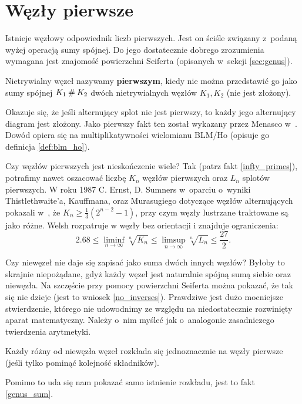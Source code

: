 \section{Węzły pierwsze}
\label{sec:prime_knots}
Istnieje węzłowy odpowiednik liczb pierwszych.
Jest on ściśle związany z~podaną wyżej operacją sumy spójnej.
Do jego dostatecznie dobrego zrozumienia wymagana jest znajomość powierzchni Seiferta (opisanych w~sekcji \ref{sec:genus}).

\begin{definition}
	\label{primeknot}
    Nietrywialny węzeł nazywamy \textbf{pierwszym},
    kiedy nie można przedstawić go jako sumy spójnej $K_1 \mathbin{\#} K_2$
    dwóch nietrywialnych węzłów $K_1, K_2$ (nie jest złożony).
\end{definition}

Okazuje się, że jeśli alternujący splot nie jest pierwszy,
to każdy jego alternujący diagram jest złożony.
Jako pierwszy fakt ten został wykazany przez Menasco w~\cite{menasco84}.
Dowód opiera się na multiplikatywności wielomianu BLM/Ho (opisuje go definicja \ref{def:blm_ho}).

Czy węzłów pierwszych jest nieskończenie wiele?
Tak (patrz fakt \ref{infty_primes}), potrafimy nawet oszacować liczbę $K_n$ węzłów pierwszych oraz $L_n$ splotów pierwszych.
W roku 1987 C. Ernst, D. Sumners w~oparciu o~wyniki Thistlethwaite'a, Kauffmana, oraz Murasugiego dotyczące węzłów alternujących pokazali w~\cite{ernst87}, że $K_n \ge \frac 1 3 (2^{n- 2} - 1)$, przy czym węzły lustrzane traktowane są jako różne.
Welsh rozpatruje w \cite{welsh92} węzły bez orientacji i znajduje ograniczenia:
\[
    2.68 \le \liminf_{n \to \infty}  \sqrt[n]{K_n} \le \limsup_{n \to \infty} \sqrt[n]{L_n} \le \frac {27}{2}.
\]


Czy niewęzeł nie daje się zapisać jako suma dwóch innych węzłów?
Byłoby to skrajnie niepożądane, gdyż każdy węzeł jest naturalnie spójną sumą siebie oraz niewęzła.
Na szczęście przy pomocy powierzchni Seiferta można pokazać, że tak się nie dzieje (jest to wniosek \ref{no_inverses}).
Prawdziwe jest dużo mocniejsze stwierdzenie,
którego nie udowodnimy ze względu na niedostatecznie rozwinięty aparat matematyczny.
Należy o~nim myśleć jak o~analogonie zasadniczego twierdzenia arytmetyki.

\begin{theorem}[Schubert, 1949]
    Każdy różny od niewęzła węzeł rozkłada się jednoznacznie na węzły pierwsze
    (jeśli tylko pominąć kolejność składników).
\end{theorem}

Pomimo to uda się nam pokazać samo istnienie rozkładu, jest to fakt \ref{genus_sum}.
